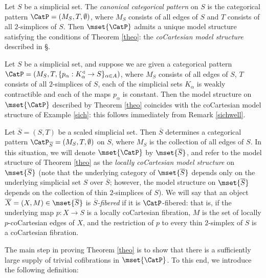 \begin{example}\label{sich}
Let $S$ be a simplicial set. The {\it canonical categorical pattern} on $S$ is the categorical
pattern $\CatP = (M_S, T, \emptyset)$, where $M_S$ consists of all edges of $S$ and $T$ consists of all
$2$-simplices of $S$. Then $\mset{\CatP}$ admits a unique model structure satisfying the conditions
of Theorem \ref{theo}: the {\it coCartesian model structure} described in \S {}.
\end{example}

\begin{example}\label{sipper}
Let $S$ be a simplicial set, and suppose we are given a categorical pattern
$\CatP = (M_S, T, \{ p_{\alpha}: K_{\alpha}^{\triangleleft} \rightarrow S \}_{\alpha \in A})$, where $M_S$ consists of all edges of $S$, $T$ consists of all
$2$-simplices of $S$, each of the simplicial sets $K_{\alpha}$ is weakly contractible and
each of the maps $p_{\alpha}$ is constant. Then the model structure on $\mset{ \CatP}$ described
by Theorem \ref{theo} coincides with the coCartesian model structure of Example \ref{sich}: this follows immediately from Remark \ref{sichwell}. 
\end{example}

\begin{example}\label{user}
Let $\overline{S} = (S,T)$ be a scaled simplicial set. Then $\overline{S}$ determines a
categorical pattern $\CatP_{ \overline{S}} = (M_S, T, \emptyset)$ on $S$, where $M_S$ is the collection of all edges of $S$. In this situation, we will denote $\mset{ \CatP}$ by $\mset{ \overline{S} }$, and refer to the
model structure of Theorem \ref{theo} as the {\it locally coCartesian model structure} on $\mset{ \overline{S}}$ (note that the underlying category of $\mset{ \overline{S} }$ depends only on
the underlying simplicial set $S$ over $\overline{S}$; however, the model structure on
$\mset{ \overline{S} }$ depends on the collection of thin $2$-simplices of $S$). We will say that
an object $\overline{X} = (X,M) \in \mset{ \overline{S} }$ is {\it $\overline{S}$-fibered} if it is
$\CatP$-fibered: that is, if the underlying map $p: X \rightarrow S$ is a locally coCartesian fibration, 
$M$ is the set of locally $p$-coCartesian edges of $X$, and the restriction of $p$ to every
thin $2$-simplex of $S$ is a coCartesian fibration.
\end{example}

The main step in proving Theorem \ref{theo} is to show that there is a sufficiently large supply of
trivial cofibrations in $\mset{\CatP}$. To this end, we introduce the following definition:


